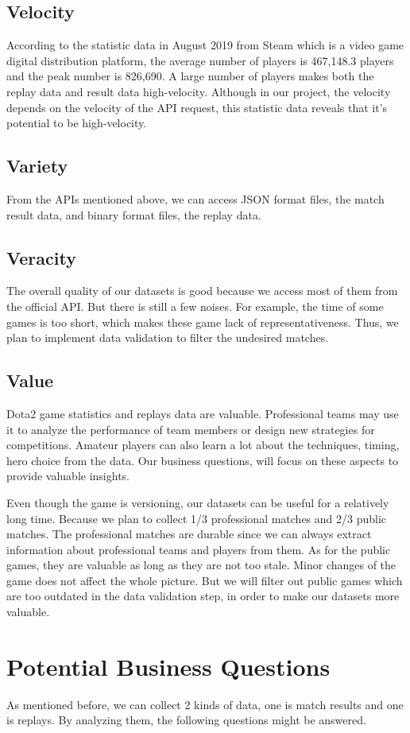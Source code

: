 \documentclass{article}
\newcommand{\bigdataVs}[1]{
	\subsection{#1}
}
\begin{document}
\bigdataVs{Velocity}

According to the statistic data in August 2019 from Steam which is a video game digital distribution platform, the average number of players is 467,148.3 players and the peak number is 826,690.
A large number of players makes both the replay data and result data high-velocity.
Although in our project, the velocity depends on the velocity of the API request, this statistic data reveals that it's potential to be high-velocity.

\bigdataVs{Variety}

From the APIs mentioned above, we can access JSON format files, the match result data, and binary format files, the replay data.

\bigdataVs{Veracity}

The overall quality of our datasets is good because we access most of them from the official API.
But there is still a few noises.
For example, the time of some games is too short, which makes these game lack of representativeness.
Thus, we plan to implement data validation to filter the undesired matches.

\bigdataVs{Value}

Dota2 game statistics and replays data are valuable.
Professional teams may use it to analyze the performance of team members or design new strategies for competitions.
Amateur players can also learn a lot about the techniques, timing, hero choice from the data.
Our business questions, will focus on these aspects to provide valuable insights.

Even though the game is versioning, our datasets can be useful for a relatively long time.
Because we plan to collect 1/3 professional matches and 2/3 public matches.
The professional matches are durable since we can always extract information about professional teams and players from them.
As for the public games, they are valuable as long as they are not too stale. Minor changes of the game does not affect the whole picture.
But we will filter out public games which are too outdated in the data validation step, in order to make our datasets more valuable.

\section{Potential Business Questions}

As mentioned before, we can collect 2 kinds of data, one is match results and one is replays.
By analyzing them, the following questions might be answered.
\end{document}
